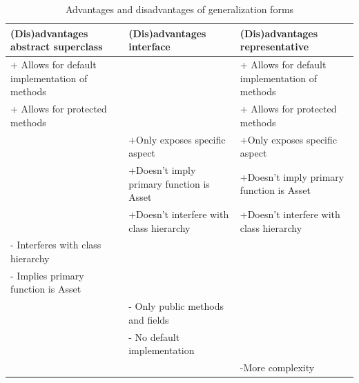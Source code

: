 				
				\begin{table}
					\begin{tabular}{|p{4cm}|p{4cm}|p{4cm}|}
					\hline
					(Dis)advantages abstract superclass & (Dis)advantages interface & (Dis)advantages representative \\
					\hline
					+ Allows for default implementation of methods&&+ Allows for default implementation of methods\\
					+ Allows for protected methods&&+ Allows for protected methods\\
					&+Only exposes specific aspect&+Only exposes specific aspect\\
					&+Doesn't imply primary function is Asset&+Doesn't imply primary function is Asset\\
					&+Doesn't interfere with class hierarchy&+Doesn't interfere with class hierarchy\\
					\hline
					- Interferes with class hierarchy&&\\
					- Implies primary function is Asset&&\\
					&- Only public methods and fields&\\
					&- No default implementation&\\
					&& -More complexity\\
					\hline
					\end{tabular}

				\caption{Advantages and disadvantages of generalization forms}
				\label{generalization}
				\end{table}
				
